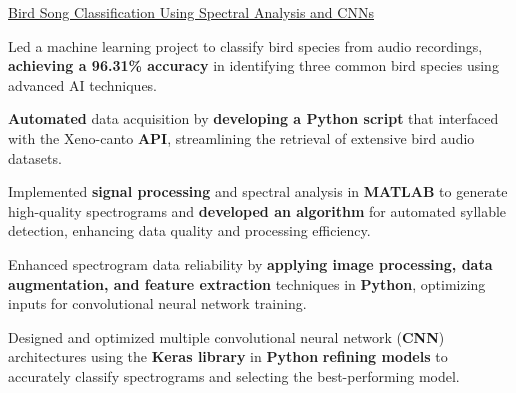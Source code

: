 \begin{rSubsection}{\href{https://github.com/AliBakly/Bird-Song-Classification-Using-Spectral-Analysis-and-CNNs}{\underline{Bird Song Classification Using Spectral Analysis and CNNs} \href{ProjectLink}{\raisebox{-0.1\height}\faExternalLink }}}{}{}{}{}{}{}
    \item Led a machine learning project to classify bird species from audio recordings, \textbf{achieving a 96.31\% accuracy} in identifying three common bird species using advanced AI techniques.
        
    \item \textbf{Automated} data acquisition by \textbf{developing a Python script} that interfaced with the Xeno-canto \textbf{API}, streamlining the retrieval of extensive bird audio datasets.
    
    \item Implemented \textbf{signal processing} and spectral analysis in \textbf{MATLAB} to generate high-quality spectrograms and \textbf{developed an algorithm} for automated syllable detection, enhancing data quality and processing efficiency.
    
    \item Enhanced spectrogram data reliability by \textbf{applying image processing, data augmentation, and feature extraction} techniques in \textbf{Python}, optimizing inputs for convolutional neural network training.
    
    \item Designed and optimized multiple convolutional neural network (\textbf{CNN}) architectures using the \textbf{Keras library} in \textbf{Python} \textbf{refining models} to accurately classify spectrograms and selecting the best-performing model.
    \end{rSubsection}
\vspace{-8pt}